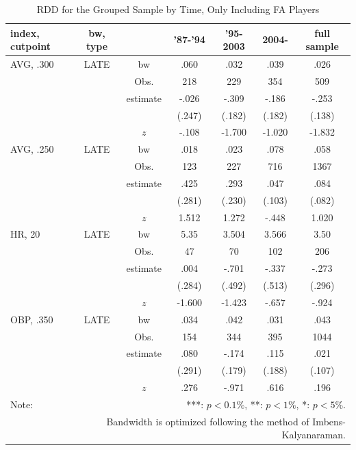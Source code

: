 \documentclass[dvipdfmx, 12pt]{article}
\begin{document}
\begin{table}
  \centering
  \caption{RDD for the Grouped Sample by Time, Only Including FA Players}
  \label{RDD_Era_FA}
  \footnotesize
  \begin{tabular}{lcccccc} \hline
    index, cutpoint & bw, type &  &'87-'94 & '95-2003 & 2004- &full sample \\ \hline \hline
    AVG, .300 & LATE & bw & .060 & .032 & .039 & .026 \\
    &  & Obs. & 218 & 229 & 354 & 509 \\
    &  & estimate & -.026 & -.309 & -.186 & -.253 \\
    &  & & (.247) & (.182) & (.182) & (.138) \\
    & & $z$ & -.108 & -1.700 &  -1.020 & -1.832 \\ \hline
    AVG, .250 & LATE & bw & .018 & .023 & .078 & .058 \\
    &  & Obs. & 123 & 227 & 716 & 1367 \\
    &  & estimate & .425 & .293 & .047 & .084 \\
    &  & & (.281) & (.230) & (.103) & (.082) \\
    & & $z$ & 1.512 & 1.272 & -.448 & 1.020 \\ \hline
    HR, 20 & LATE & bw & 5.35 & 3.504 & 3.566 & 3.50 \\
    &  & Obs. & 47 & 70 & 102 & 206 \\
    &  & estimate & .004 & -.701 & -.337 & -.273 \\
    &  & & (.284) & (.492) & (.513) & (.296) \\
    & & $z$ & -1.600 & -1.423 & -.657 & -.924 \\ \hline
    OBP, .350 & LATE & bw & .034 & .042 & .031 & .043 \\
    &  & Obs. & 154 & 344 & 395 & 1044 \\
    &  & estimate & .080 & -.174 & .115 & .021 \\
    &  & & (.291) & (.179) & (.188) & (.107) \\
    & & $z$ & .276 & -.971 & .616 & .196 \\ \hline
    Note: & \multicolumn{6}{r}{***: $p<0.1\%$, **: $p<1\%$, *: $p<5\%$.} \\
    & \multicolumn{6}{r}{Bandwidth is optimized following the method of Imbens-Kalyanaraman.}
  \end{tabular}
\end{table}

\begin{landscape}
  \begin{table}
    
  \end{table}
\end{landscape}
\end{document}
